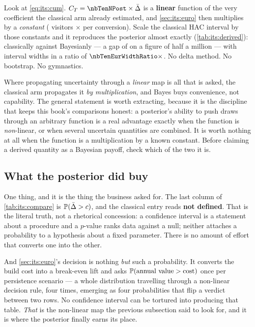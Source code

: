 Look at \cref{eq:its:cum}. $C_T = \nbTenNPost \times \bar\Delta$ is a \textbf{linear} function of
the very coefficient the classical arm already estimated, and \cref{sec:its:euro} then multiplies
by a \emph{constant} (\nbTenVisitors{} visitors $\times$ \eur{\nbTenConvValue} per conversion).
Scale the classical HAC interval by those constants and it reproduces the posterior almost exactly
(\cref{tab:its:derived}): \eur{\nbTenEurCls} classically against \eur{\nbTenEurBayes} Bayesianly
--- a gap of \eur{\nbTenEurGap} on a figure of half a million --- with interval widths in a ratio
of $\nbTenEurWidthRatio\times$. No delta method. No bootstrap. No gymnastics.



Where propagating uncertainty through a \emph{linear} map is all that is asked, the classical arm
propagates it \emph{by multiplication}, and Bayes buys convenience, not capability. The general
statement is worth extracting, because it is the discipline that keeps this book's comparisons
honest: a posterior's ability to push draws through an arbitrary function is a real advantage
exactly when the function is \emph{non}-linear, or when several uncertain quantities are combined.
It is worth nothing at all when the function is a multiplication by a known constant. Before
claiming a derived quantity as a Bayesian payoff, check which of the two it is.

\subsection*{What the posterior did buy}

One thing, and it is the thing the business asked for. The last column of \cref{tab:its:compare}
is $\operatorname{\mathbb{P}}(\bar\Delta > c)$, and the classical entry reads \textbf{not defined}. That is the literal
truth, not a rhetorical concession: a confidence interval is a statement about a procedure and a
$p$-value ranks data against a null; neither attaches a probability to a hypothesis about a fixed
parameter. There is no amount of effort that converts one into the other.

And \cref{sec:its:euro}'s decision is nothing \emph{but} such a probability. It converts the
\eur{\nbTenCost} build cost into a break-even lift and asks $\operatorname{\mathbb{P}}(\text{annual value} >
\text{cost})$ once per persistence scenario --- a whole distribution travelling through a
non-linear decision rule, four times, emerging as four probabilities that flip a verdict between
two rows. No confidence interval can be tortured into producing that table. \emph{That} is the
non-linear map the previous subsection said to look for, and it is where the posterior finally
earns its place.

